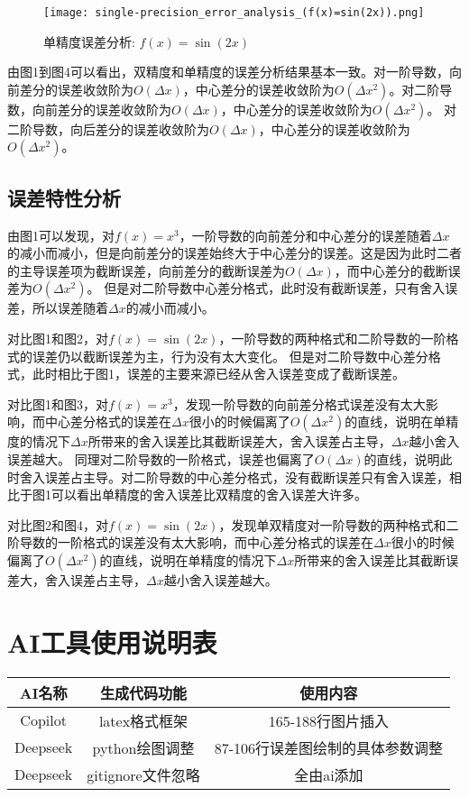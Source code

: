 \documentclass[12pt,a4paper]{article}
\begin{document}
\begin{figure}[!htbp]
    \centering
    \texttt{[image: single-precision\_error\_analysis\_(f(x)=sin(2x)).png]}
    \caption{单精度误差分析: $f(x) = \sin(2x)$}
\end{figure}
\newpage

由图1到图4可以看出，双精度和单精度的误差分析结果基本一致。对一阶导数，向前差分的误差收敛阶为$O(\Delta x)$，中心差分的误差收敛阶为$O(\Delta x^2)$。对二阶导数，向前差分的误差收敛阶为$O(\Delta x)$，中心差分的误差收敛阶为$O(\Delta x^2)$。
对二阶导数，向后差分的误差收敛阶为$O(\Delta x)$，中心差分的误差收敛阶为$O(\Delta x^2)$。

\subsection{误差特性分析}


由图1可以发现，对$f(x) = x^3$，一阶导数的向前差分和中心差分的误差随着$\Delta x$的减小而减小，但是向前差分的误差始终大于中心差分的误差。这是因为此时二者的主导误差项为截断误差，向前差分的截断误差为$O(\Delta x)$，而中心差分的截断误差为$O(\Delta x^2)$。
但是对二阶导数中心差分格式，此时没有截断误差，只有舍入误差，所以误差随着$\Delta x$的减小而减小。

对比图1和图2，对$f(x) = \sin(2x)$，一阶导数的两种格式和二阶导数的一阶格式的误差仍以截断误差为主，行为没有太大变化。
但是对二阶导数中心差分格式，此时相比于图1，误差的主要来源已经从舍入误差变成了截断误差。

对比图1和图3，对$f(x) = x^3$，发现一阶导数的向前差分格式误差没有太大影响，而中心差分格式的误差在$\Delta x$很小的时候偏离了$O(\Delta x^2)$的直线，说明在单精度的情况下$\Delta x$所带来的舍入误差比其截断误差大，舍入误差占主导，$\Delta x$越小舍入误差越大。
同理对二阶导数的一阶格式，误差也偏离了$O(\Delta x)$的直线，说明此时舍入误差占主导。对二阶导数的中心差分格式，没有截断误差只有舍入误差，相比于图1可以看出单精度的舍入误差比双精度的舍入误差大许多。

对比图2和图4，对$f(x) = \sin(2x)$，发现单双精度对一阶导数的两种格式和二阶导数的一阶格式的误差没有太大影响，而中心差分格式的误差在$\Delta x$很小的时候偏离了$O(\Delta x^2)$的直线，说明在单精度的情况下$\Delta x$所带来的舍入误差比其截断误差大，舍入误差占主导，$\Delta x$越小舍入误差越大。

\section{AI工具使用说明表}
\begin{table}[!htbp]
    \centering
    \begin{tabular}{|c|c|c|}
        \hline
        \textbf{AI名称} & \textbf{生成代码功能} & \textbf{使用内容} \\
        \hline
        Copilot & latex格式框架 &  165-188行图片插入\\
        \hline
        Deepseek & python绘图调整 & 87-106行误差图绘制的具体参数调整\\
        \hline
        Deepseek & gitignore文件忽略 & 全由ai添加\\
        \hline
\end{tabular}
\end{table}
\end{document}
